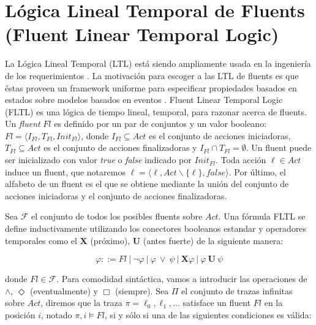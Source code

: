 \section{Lógica Lineal Temporal de Fluents (Fluent Linear Temporal Logic)}
\label{LTL}

La Lógica Lineal Temporal (LTL) está siendo ampliamente usada en la ingeniería de los requerimientos
\cite{1347546,Giannakopoulou:2003:FMC:940071.940106,879820,Letier:2002:ATG:581339.581353}. La motivación para escoger a
las LTL de fluents es que éstas proveen un framework uniforme para especificar propiedades basados en estados sobre
modelos basados en eventos \cite{Giannakopoulou:2003:FMC:940071.940106}. Fluent Linear Temporal Logic (FLTL) \cite{Giannakopoulou:2003:FMC:940071.940106}
es una lógica de tiempo lineal, temporal, para razonar acerca de fluents. Un \emph{fluent} $Fl$ es definido por un par de
conjuntos y un valor booleano: $Fl = \langle I_{Fl},T_{Fl},Init_{Fl}\rangle$, donde $I_{Fl} \subseteq Act$ es el
conjunto de acciones iniciadoras, $T_{Fl} \subseteq Act$ es el conjunto de acciones finalizadoras y $I_{Fl} \cap T_{Fl}
= \emptyset$. Un fluent puede ser inicializado con valor \emph{true} o \emph{false} indicado por $Init_{Fl}$. Toda acción $\ell \in
Act$ induce un fluent, que notaremos $\ell = \langle\ell, Act \backslash \{\ell\}, false\rangle$. Por último, el alfabeto
de un fluent es el que se obtiene mediante la unión del conjunto de acciones iniciadoras y el conjunto de acciones
finalizadoras.

Sea $\mathcal{F}$ el conjunto de todos los posibles fluents sobre $Act$. Una fórmula FLTL se define inductivamente
utilizando los conectores booleanos estandar y operadores temporales como el $\mathbf{X}$ (próximo), $\mathbf{U}$ (antes
fuerte) de la siguiente manera:

\begin{center}
\begin{equation}
    \varphi ::= Fl\ |\ \neg\varphi\ |\ \varphi\ \lor\ \psi\ |\ \mathbf{X} \varphi\ |\ \varphi\ \mathbf{U}\ \psi
\end{equation}
\end{center}

\noindent donde $Fl \in \mathcal{F}$. Para comodidad sintáctica, vamos a introducir las operaciones de $\land$,
$\Diamond$ (eventualmente) y $\Box$ (siempre). Sea $\Pi$ el conjunto de trazas infinitas sobre $Act$, diremos que la
traza $\pi = \ell_0,\ell_1,...$ satisface un fluent $Fl$ en la posición $i$, notado $\pi,i\vDash Fl$, si y sólo si una de
las siguientes condiciones es válida:

